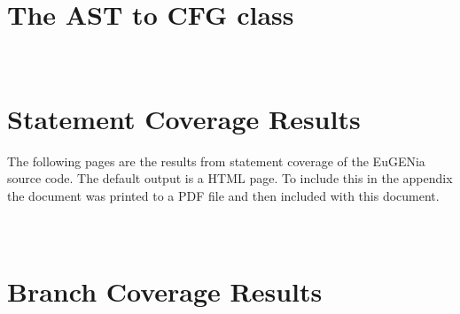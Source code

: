 \chapter{\\The AST to CFG class}
\label{App:SampleEuGENia}
%

%
%
%

\chapter{\\Statement Coverage Results}
\label{App:StatementCoverage}

The following pages are the results from statement coverage of the EuGENia source code. The default output is a HTML page. To include this in the appendix the document was printed to a PDF file and then included with this document.





\chapter{\\Branch Coverage Results}
\label{App:BranchCoverage}


